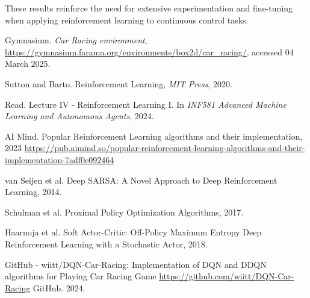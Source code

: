 \documentclass[../CSC_52081_EP.tex]{subfiles}
\begin{document}
        These results reinforce the need for extensive experimentation and fine-tuning when applying reinforcement learning to continuous control tasks.

    \begin{thebibliography}{4}
            Gymnasium. \textit{Car Racing environment}, \url{https://gymnasium.farama.org/environments/box2d/car_racing/}, accessed 04 March 2025.

        Sutton and Barto. Reinforcement Learning,
        {\em MIT Press}, 2020.

            Read. Lecture IV - Reinforcement Learning I. In \textit{INF581 Advanced Machine Learning and Autonomous Agents}, 2024.

            AI Mind. Popular Reinforcement Learning algorithms and their implementation, 2023 \url{https://pub.aimind.so/popular-reinforcement-learning-algorithms-and-their-implementation-7adf0e092464}

            van Seijen et al. Deep SARSA: A Novel Approach to Deep Reinforcement Learning, 2014.

            Schulman et al. Proximal Policy Optimization Algorithms, 2017.

            Haarnoja et al. Soft Actor-Critic: Off-Policy Maximum Entropy Deep Reinforcement Learning with a Stochastic Actor, 2018.

            GitHub - wiitt/DQN-Car-Racing: Implementation of DQN and DDQN algorithms for Playing Car Racing Game \url{https://github.com/wiitt/DQN-Car-Racing} GitHub. 2024.


        \end{thebibliography}
\end{document}
